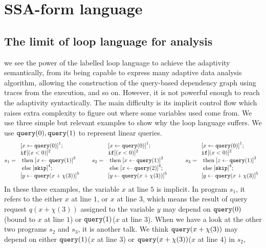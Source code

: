 \documentclass[a4paper,11pt]{article}
\begin{document}
\section{SSA-form language  }
%
{
\subsection{The limit of loop language for analysis}
we see the power of the labelled loop language to achieve the adaptivity semantically, from its being capable to express many adaptive data analysis algorithm,  allowing the construction of the query-based dependency graph using traces from the execution, and so on.
However, it is not powerful enough to reach the adaptivity syntactically. The main difficulty is its implicit control flow which raises extra complexity to figure out where some variables used come from. We use three simple but relevant examples to show why the loop language suffers. We use ${\tt query}(0),{\tt query}(1)$ to represent linear queries.
%
\[
 s_1 = \begin{array}{l}
      \clabel{ \assign{x}{\query(0)}}^{1} ; \\
      \eif  [(x < 0 )]^{2} \\
      \ethen \clabel{\assign{x}{\query(1)}}^{3}\\
      \eelse \clabel{\eskip}^{4} ; \\
      \clabel{\assign{y}{\query(x+\chi(3))}}^{5}
 \end{array}
 ~~~~~
  s_2 = \begin{array}{l}
      \clabel{ \assign{x}{\query(0)}}^{1} ; \\
      \eif  [(x < 0 )]^{2} \\
      \ethen \clabel{\assign{x}{\query(1)}}^{3}\\
      \eelse \clabel{\assign{x}{\query(2)}}^{4} ; \\
      \clabel{\assign{y}{\query(x+\chi(3))}}^{5}
 \end{array}
 ~~~~~~~~
  s_3 = \begin{array}{l}
      \clabel{ \assign{x}{\query(0)}}^{1} ; \\
      \eif  [(x < 0 )]^{2} \\
      \ethen \clabel{\assign{z}{\query(1)}}^{3}\\
      \eelse \clabel{\eskip}^{4} ; \\
      \clabel{\assign{y}{\query(x+\chi(3)}}^{5}
 \end{array}
\]
In these three examples, the variable $x$ at line $5$ is implicit. In program $s_1$, it refers to the either $x$ at line $1$, or $x$ at line $3$, which means the result of query request $q(x+\chi(3))$ assigned to the variable $y$ may depend on ${\tt query}(0)$(bound to $x$ at line $1$) or ${\tt query}(1)$($x$ at line $3$). When we have a look at the other two programs $s_2$ and $s_3$, it is another talk. We think ${\tt query}(x+\chi(3))$ may depend on either ${\tt query}(1)$($x$ at line $3$) or ${\tt query}(x+\chi(3))$($x$ at line $4$) in $s_2$,     
}
\end{document}
